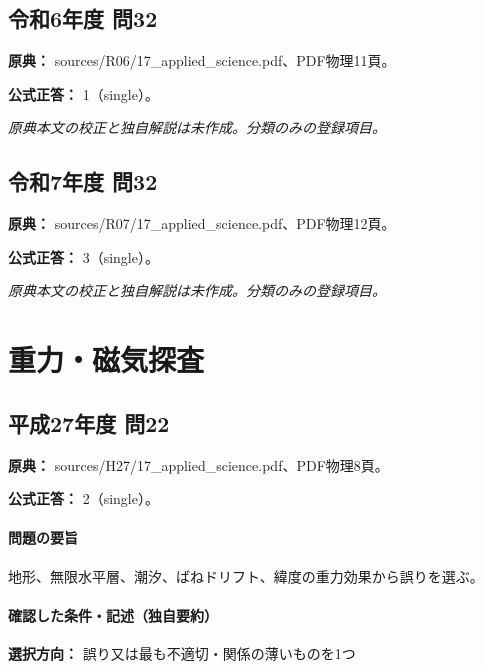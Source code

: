 \subsection{令和6年度 問32}
\label{q:r06-reg-applied-32}

\noindent\textbf{原典：} sources/R06/17\_applied\_science.pdf、PDF物理11頁。

\textbf{公式正答：} 1（single）。

\par\textit{原典本文の校正と独自解説は未作成。分類のみの登録項目。}

\subsection{令和7年度 問32}
\label{q:r07-reg-applied-32}

\noindent\textbf{原典：} sources/R07/17\_applied\_science.pdf、PDF物理12頁。

\textbf{公式正答：} 3（single）。

\par\textit{原典本文の校正と独自解説は未作成。分類のみの登録項目。}

\section{重力・磁気探査}

\subsection{平成27年度 問22}
\label{q:h27-reg-applied-22}

\noindent\textbf{原典：} sources/H27/17\_applied\_science.pdf、PDF物理8頁。

\textbf{公式正答：} 2（single）。

\paragraph{問題の要旨} 地形、無限水平層、潮汐、ばねドリフト、緯度の重力効果から誤りを選ぶ。

\paragraph{確認した条件・記述（独自要約）}\mbox{}\par

\noindent\textbf{選択方向：} 誤り又は最も不適切・関係の薄いものを1つ\par


